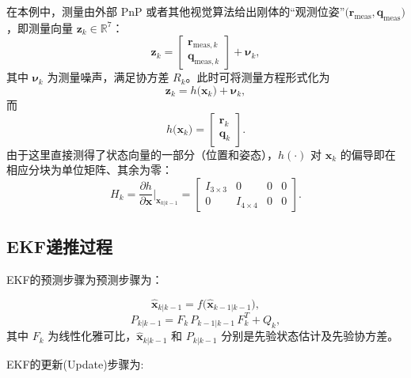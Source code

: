 在本例中，测量由外部 PnP 或者其他视觉算法给出刚体的“观测位姿”\(\bigl(\mathbf{r}_{\mathrm{meas}}, \mathbf{q}_{\mathrm{meas}}\bigr)\)，即测量向量 \(\mathbf{z}_k \in \mathbb{R}^7\)：
\begin{equation}
	\mathbf{z}_k =
	\begin{bmatrix}
		\mathbf{r}_{\text{meas},k} \\[6pt]
		\mathbf{q}_{\text{meas},k}
	\end{bmatrix}
	+
	\boldsymbol{\nu}_k,
\end{equation}
其中 \(\boldsymbol{\nu}_k\) 为测量噪声，满足协方差 \(R_k\)。此时可将测量方程形式化为
\begin{equation}
	\mathbf{z}_k = h\bigl(\mathbf{x}_k\bigr) + \boldsymbol{\nu}_k,
\end{equation}
而
\begin{equation}
	h\bigl(\mathbf{x}_k\bigr) =
	\begin{bmatrix}
		\mathbf{r}_k \\
		\mathbf{q}_k
	\end{bmatrix}.
\end{equation}
由于这里直接测得了状态向量的一部分（位置和姿态），\(h(\cdot)\) 对 \(\mathbf{x}_k\) 的偏导即在相应分块为单位矩阵、其余为零：
\begin{equation}
	\label{eq:Hk_jac}
	H_k = \frac{\partial h}{\partial \mathbf{x}}\Bigg|_{\hat{\mathbf{x}}_{k|k-1}}
	=
	\begin{bmatrix}
		I_{3\times 3} & 0 & 0 & 0 \\
		0 & I_{4\times 4} & 0 & 0
	\end{bmatrix}.
\end{equation}

\subsection{EKF递推过程}

\noindent
EKF的预测步骤为预测步骤为：

\begin{equation}
	\hat{\mathbf{x}}_{k|k-1} = f\bigl(\hat{\mathbf{x}}_{k-1|k-1}\bigr),
\end{equation}
\begin{equation}
	P_{k|k-1} = F_k \, P_{k-1|k-1} \, F_k^T + Q_k,
\end{equation}
其中 \(F_k\) 为线性化雅可比，\(\hat{\mathbf{x}}_{k|k-1}\) 和 \(P_{k|k-1}\) 分别是先验状态估计及先验协方差。

\noindent
EKF的更新(Update)步骤为:

